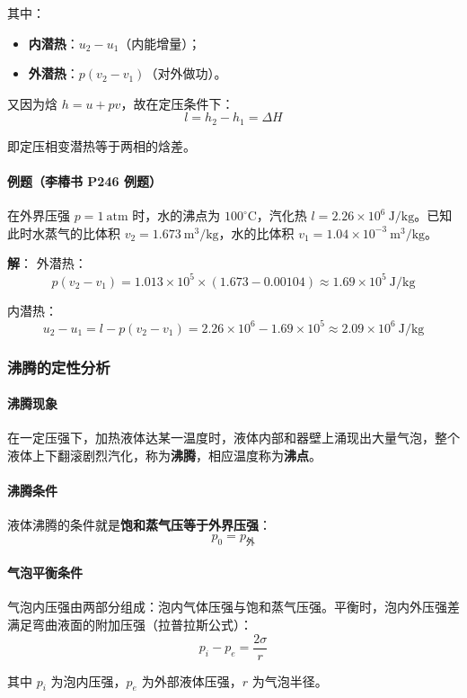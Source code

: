 \documentclass[UTF8]{ctexart}
\begin{document}
其中：
\begin{itemize}[leftmargin=2em]
  \item \textbf{内潜热}：$u_2-u_1$（内能增量）；
  \item \textbf{外潜热}：$p(v_2-v_1)$（对外做功）。
\end{itemize}

又因为焓 $h=u+pv$，故在定压条件下：
\[
\boxed{l=h_2-h_1=\Delta H}
\]

即定压相变潜热等于两相的焓差。

\paragraph{例题（李椿书 P246 例题）}
在外界压强 $p=1\ \mathrm{atm}$ 时，水的沸点为 $100^{\circ}\mathrm{C}$，汽化热 $l=2.26\times 10^6\ \mathrm{J/kg}$。已知此时水蒸气的比体积 $v_2=1.673\ \mathrm{m^3/kg}$，水的比体积 $v_1=1.04\times 10^{-3}\ \mathrm{m^3/kg}$。

\textbf{解}：
外潜热：
\[
p(v_2-v_1)=1.013\times 10^5\times(1.673-0.00104)\approx 1.69\times 10^5\ \mathrm{J/kg}
\]

内潜热：
\[
u_2-u_1=l-p(v_2-v_1)=2.26\times 10^6-1.69\times 10^5\approx 2.09\times 10^6\ \mathrm{J/kg}
\]

\subsubsection{沸腾的定性分析}

\paragraph{沸腾现象}
在一定压强下，加热液体达某一温度时，液体内部和器壁上涌现出大量气泡，整个液体上下翻滚剧烈汽化，称为\textbf{沸腾}，相应温度称为\textbf{沸点}。

\paragraph{沸腾条件}
液体沸腾的条件就是\textbf{饱和蒸气压等于外界压强}：
\[
p_0=p_{\text{外}}
\]

\paragraph{气泡平衡条件}
气泡内压强由两部分组成：泡内气体压强与饱和蒸气压强。平衡时，泡内外压强差满足弯曲液面的附加压强（拉普拉斯公式）：
\[
p_i-p_e=\frac{2\sigma}{r}
\]

其中 $p_i$ 为泡内压强，$p_e$ 为外部液体压强，$r$ 为气泡半径。
\end{document}

